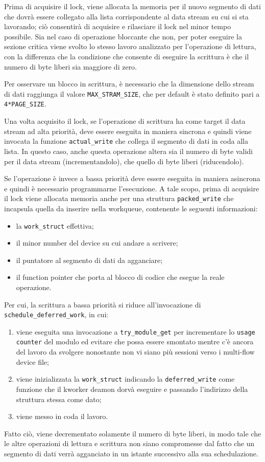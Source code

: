 \documentclass{article}
\begin{document}
Prima di acquisire il lock, viene allocata la memoria per il nuovo segmento di dati che dovrà essere collegato alla lista corrispondente al data stream su cui si sta lavorando; ciò consentirà di acquisire e rilasciare il lock nel minor tempo possibile. Sia nel caso di operazione bloccante che non, per poter eseguire la sezione critica viene svolto lo stesso lavoro analizzato per l'operazione di lettura, con la differenza che la condizione che consente di eseguire la scrittura è che il numero di byte liberi sia maggiore di zero.

Per osservare un blocco in scrittura, è necessario che la dimensione dello stream di dati raggiunga il valore \texttt{MAX\_STRAM\_SIZE}, che per default è stato definito pari a \texttt{4*PAGE\_SIZE}.

Una volta acquisito il lock, se l'operazione di scrittura ha come target il data stream ad alta priorità, deve essere eseguita in maniera sincrona e quindi viene invocata la funzione \texttt{actual\_write} che collega il segmento di dati in coda alla lista. In questo caso, anche questa operazione altera sia il numero di byte validi per il data stream (incrementandolo), che quello di byte liberi (riducendolo).

Se l'operazione è invece a bassa priorità deve essere eseguita in maniera asincrona e quindi è necessario programmarne l'esecuzione. A tale scopo, prima di acquisire il lock viene allocata memoria anche per una struttura \texttt{packed\_write} che incapsula quella da inserire nella workqueue, contenente le seguenti informazioni:
\begin{itemize}
\item la \texttt{work\_struct} effettiva;
\item il minor number del device su cui andare a scrivere;
\item il puntatore al segmento di dati da agganciare;
\item il function pointer che porta al blocco di codice che esegue la reale operazione.
\end{itemize}
Per cui, la scrittura a bassa priorità si riduce all'invocazione di \texttt{schedule\_deferred\_work}, in cui:
\begin{enumerate}
\item viene eseguita una invocazione a \texttt{try\_module\_get} per incrementare lo \texttt{usage counter} del modulo ed evitare che possa essere smontato mentre c'è ancora del lavoro da svolgere nonostante non vi siano più sessioni verso i multi-flow device file;
\item viene inizializzata la \texttt{work\_struct} indicando la \texttt{deferred\_write} come funzione che il kworker deamon dorvà eseguire e passando l'indirizzo della struttura stessa come dato;
\item viene messo in coda il lavoro.
\end{enumerate}
Fatto ciò, viene decrementato solamente il numero di byte liberi, in modo tale che le altre operazioni di lettura e scrittura non siano compromesse dal fatto che un segmento di dati verrà agganciato in un istante successivo alla sua schedulazione.
\end{document}
